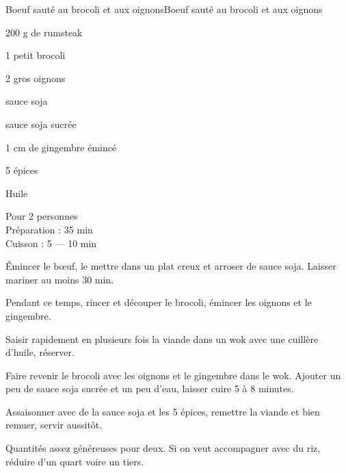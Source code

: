 \begin{recette}{Boeuf sauté au brocoli et aux oignons}{Boeuf sauté au brocoli et aux oignons}

\begin{ingredients}
200 g de rumsteak\par
1 petit brocoli\par
2 gros oignons\par
sauce soja\par
sauce soja sucrée\par
1 cm de gingembre émincé\par
5 épices\par
Huile\par
\end{ingredients}

\begin{infos}
Pour 2 personnes\\
Préparation : 35 min\\
Cuisson : 5 --- 10 min\\
\end{infos}

\begin{etapes}
\item Émincer le bœuf, le mettre dans un plat creux et arroser de sauce soja. Laisser mariner au moins 30 min.
\item Pendant ce temps, rincer et découper le brocoli, émincer les oignons et le gingembre.
\item Saisir rapidement en plusieurs fois la viande dans un wok avec une cuillère d'huile, réserver.
\item Faire revenir le brocoli avec les oignons et le gingembre dans le wok. Ajouter un peu de sauce soja sucrée et un peu d'eau, laisser cuire 5 à 8 minutes.
\item Assaisonner avec de la sauce soja et les 5 épices, remettre la viande et bien remuer, servir aussitôt.
\end{etapes}

\begin{conseils}
Quantités assez généreuses pour deux. Si on veut accompagner avec du riz, réduire d'un quart voire un tiers.
\end{conseils}

\end{recette}